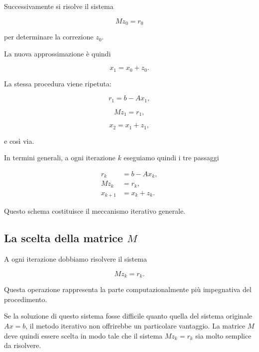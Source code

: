 Successivamente si risolve il sistema

\begin{equation*}
    Mz_0=r_0
\end{equation*}

per determinare la correzione $z_0$.

La nuova approssimazione è quindi

\begin{equation*}
    x_1=x_0+z_0.
\end{equation*}

La stessa procedura viene ripetuta:

\begin{equation*}
    r_1=b-Ax_1,
\end{equation*}

\begin{equation*}
    Mz_1=r_1,
\end{equation*}

\begin{equation*}
    x_2=x_1+z_1,
\end{equation*}

e così via.

In termini generali, a ogni iterazione $k$ eseguiamo quindi i tre
passaggi

\begin{align*}
    r_k &= b-Ax_k,\\
    Mz_k &= r_k,\\
    x_{k+1} &= x_k+z_k.
\end{align*}

Questo schema costituisce il meccanismo iterativo generale.


\subsection{La scelta della matrice $M$}

A ogni iterazione dobbiamo risolvere il sistema

\begin{equation*}
    Mz_k=r_k.
\end{equation*}

Questa operazione rappresenta la parte computazionalmente più
impegnativa del procedimento.

Se la soluzione di questo sistema fosse difficile quanto quella
del sistema originale $Ax=b$, il metodo iterativo non offrirebbe
un particolare vantaggio. La matrice $M$ deve quindi essere scelta
in modo tale che il sistema $Mz_k=r_k$ sia molto semplice da
risolvere.

